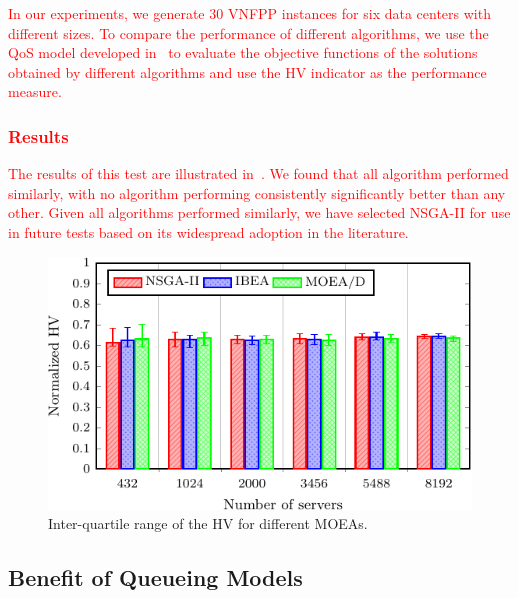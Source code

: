 \textcolor{red}{
In our experiments, we generate $30$ VNFPP instances for six data centers with different sizes. To compare the performance of different algorithms, we use the QoS model developed in~ to evaluate the objective functions of the solutions obtained by different algorithms and use the HV indicator as the performance measure.
}

\textcolor{red}{
\subsubsection{Results}
The results of this test are illustrated in~. We found that all algorithm performed similarly, with no algorithm performing consistently significantly better than any other. Given all algorithms performed similarly, we have selected NSGA-II for use in future tests based on its widespread adoption in the literature. 
}

\begin{figure}[t!]
    \centering
    \includegraphics[width=\columnwidth]{graphs/moeas/comparison-crop}
    \caption{Inter-quartile range of the HV for different MOEAs.}
    \label{fig:moea_comparison}
\end{figure}

\vspace{0.5em}
\noindent
{}

\subsection{Benefit of Queueing Models}
\label{sec:model_benefit}


